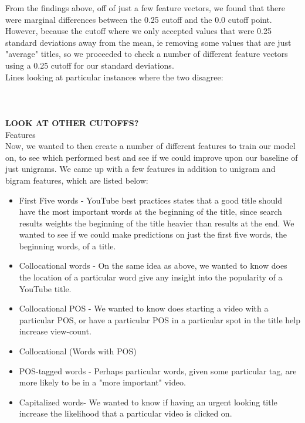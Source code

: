 \documentclass[a4paper,12pt]{article}
\begin{document}
From the findings above, off of just a few feature vectors, we found that there were marginal differences between the 0.25 cutoff and the 0.0 cutoff point. However, because the cutoff where we only accepted values that were 0.25 standard deviations away from the mean, ie removing some values that are just "average" titles, so we proceeded to check a number of different feature vectors using a 0.25 cutoff for our standard deviations. \\

Lines looking at particular instances where the two disagree:\\
\\
\\
\\

\textbf{LOOK AT OTHER CUTOFFS?} \\



Features\\

Now, we wanted to then create a number of different features to train our model on, to see which performed best and see if we could improve upon our baseline of just unigrams. We came up with a few features in addition to unigram and bigram features, which are listed below: 
\begin{itemize}
    \item First Five words - YouTube best practices states that a good title should have the most important words at the beginning of the title, since search results weights the beginning of the title heavier than results at the end. We wanted to see if we could make predictions on just the first five words, the beginning words, of a title.
  \item Collocational words - On the same idea as above, we wanted to know does the location of a particular word give any insight into the popularity of a YouTube title.
  \item Collocational POS - We wanted to know does starting a video with a particular POS, or have a particular POS in a particular spot in the title help increase view-count.
  \item Collocational (Words with POS)
  \item POS-tagged words - Perhaps particular words, given some particular tag, are more likely to be in a "more important" video.
  \item Capitalized words- We wanted to know if having an urgent looking title increase the likelihood that a particular video is clicked on.
\end{itemize}
\end{document}

